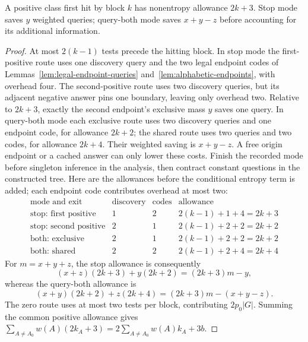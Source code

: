 \begin{claim}
\label{clm:expected-mode-costs}
A positive class first hit by block $k$ has nonentropy allowance
$2k+3$. Stop mode saves $y$ weighted queries; query-both mode saves
$x+y-z$ before accounting for its additional information.
\end{claim}
\begin{proof}
At most $2(k-1)$ tests precede the hitting block. In stop mode the
first-positive route uses one discovery query and the two legal
endpoint codes of Lemmas~\ref{lem:legal-endpoint-queries}
and~\ref{lem:alphabetic-endpoints},
with overhead four. The second-positive route uses two discovery
queries, but its adjacent negative answer pins one boundary, leaving
only overhead two. Relative to $2k+3$, exactly the second endpoint's
exclusive mass $y$ saves one query. In query-both mode each exclusive
route uses two discovery queries and one endpoint code, for allowance
$2k+2$; the shared route uses two queries and two codes, for allowance
$2k+4$. Their weighted saving is $x+y-z$. A free origin endpoint or a
cached answer can only lower these costs. Finish the recorded mode
before singleton inference in the analysis, then contract constant
questions in the constructed tree.
Here are the allowances before the conditional entropy term is
added; each endpoint code contributes overhead at most two:
\[
 \begin{array}{c|c|c|c}
  \text{mode and exit}&\text{discovery}&
       \text{codes}&\text{allowance}\\\hline
  \text{stop: first positive}&1&2&2(k-1)+1+4=2k+3\\
  \text{stop: second positive}&2&1&2(k-1)+2+2=2k+2\\
  \text{both: exclusive}&2&1&2(k-1)+2+2=2k+2\\
  \text{both: shared}&2&2&2(k-1)+2+4=2k+4
 \end{array}
\]
For $m=x+y+z$, the stop allowance is consequently
\[
 (x+z)(2k+3)+y(2k+2)=(2k+3)m-y,
\]
whereas the query-both allowance is
\[
 (x+y)(2k+2)+z(2k+4)
       =(2k+3)m-(x+y-z).
\]
The zero route uses at most two tests per block, contributing
$2p_0|G|$. Summing the common positive allowance gives
$\sum_{A\ne A_0}w(A)(2k_A+3)=2\sum_{A\ne A_0}w(A)k_A+3b$.
\end{proof}

